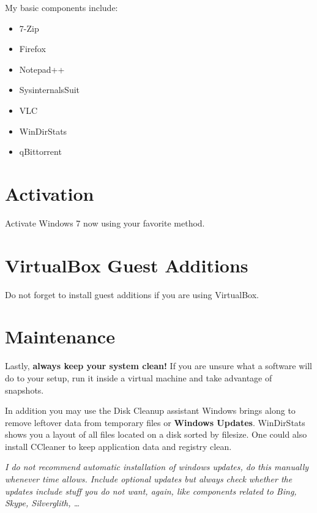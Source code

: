 \documentclass{itsarticle}
\begin{document}

My basic components include:

\begin{itemize}
    \item 7-Zip
    \item Firefox
    \item Notepad++
    \item SysinternalsSuit
    \item VLC
    \item WinDirStats
    \item qBittorrent
\end{itemize}

\section{Activation}
\label{sec:activation}

Activate Windows 7 now using your favorite method.

\section{VirtualBox Guest Additions}
\label{sec:guest_additions}

Do not forget to install guest additions if you are using VirtualBox.

\section{Maintenance}
\label{sec:maintenance}

Lastly, \textbf{always keep your system clean!} If you are unsure what a
software will do to your setup, run it inside a virtual machine and take
advantage of snapshots.

In addition you may use the Disk Cleanup assistant Windows brings along to
remove leftover data from temporary files or \textbf{Windows Updates}.
WinDirStats shows you a layout of all files located on a disk sorted by
filesize. One could also install CCleaner to keep application data and registry
clean.

\textit{I do not recommend automatic installation of windows updates, do this
manually whenever time allows. Include optional updates but always check
whether the updates include stuff you do not want, again, like components
related to Bing, Skype, Silverglith, \ldots}
\end{document}

